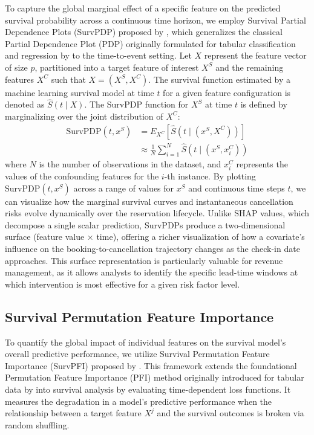 \documentclass[pdflatex,iicol,sn-mathphys-ay]{sn-jnl}
\theoremstyle{thmstyleone}%
\theoremstyle{thmstyletwo}%
\theoremstyle{thmstylethree}%
\begin{document}
To capture the global marginal effect of a specific feature on the predicted survival probability across a continuous time horizon, we employ Survival Partial Dependence Plots (SurvPDP) proposed by \cite{langbein2025interpretable}, which generalizes the classical Partial Dependence Plot (PDP) originally formulated for tabular classification and regression by \cite{friedman2001greedy} to the time-to-event setting. Let $X$ represent the feature vector of size $p$, partitioned into a target feature of interest $X^S$ and the remaining features $X^C$ such that $X = (X^S, X^C)$. The survival function estimated by a machine learning survival model at time $t$ for a given feature configuration is denoted as $\hat{S}(t \mid X)$. The SurvPDP function for $X^S$ at time $t$ is defined by marginalizing over the joint distribution of $X^C$:
\begin{align}
\text{SurvPDP}(t, x^S) &= E_{X^C} \left[ \hat{S}(t \mid (x^S, X^C)) \right] \nonumber \\
                        &\approx \frac{1}{N} \sum_{i=1}^N \hat{S}\left(t \mid (x^S, x_i^C)\right)
\end{align}
where $N$ is the number of observations in the dataset, and $x_i^C$ represents the values of the confounding features for the $i$-th instance. By plotting $\text{SurvPDP}(t, x^S)$ across a range of values for $x^S$ and continuous time steps $t$, we can visualize how the marginal survival curves and instantaneous cancellation risks evolve dynamically over the reservation lifecycle. Unlike SHAP values, which decompose a single scalar prediction, SurvPDPs produce a two-dimensional surface (feature value × time), offering a richer visualization of how a covariate's influence on the booking-to-cancellation trajectory changes as the check-in date approaches. This surface representation is particularly valuable for revenue management, as it allows analysts to identify the specific lead-time windows at which intervention is most effective for a given risk factor level.

\subsection{Survival Permutation Feature Importance}

To quantify the global impact of individual features on the survival model's overall predictive performance, we utilize Survival Permutation Feature Importance (SurvPFI) proposed by \cite{langbein2025interpretable}. This framework extends the foundational Permutation Feature Importance (PFI) method originally introduced for tabular data by \cite{breiman2001random} into survival analysis by evaluating time-dependent loss functions. It measures the degradation in a model's predictive performance when the relationship between a target feature $X^j$ and the survival outcomes is broken via random shuffling.
\end{document}

